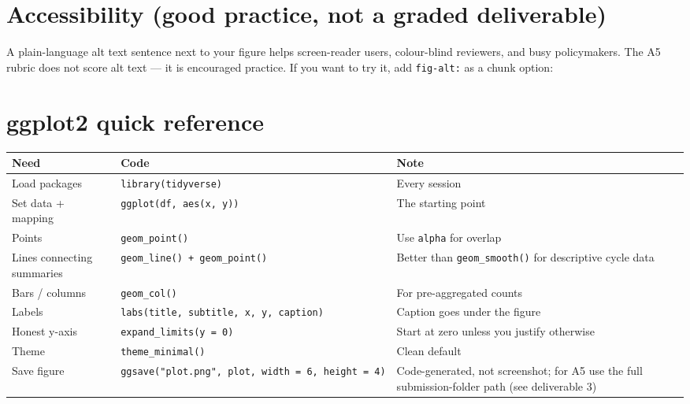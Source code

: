 \documentclass[
  letterpaper,
  DIV=11,
  numbers=noendperiod,
  oneside]{scrreprt}
\begin{document}
\section*{Accessibility (good practice, not a graded
deliverable)}\label{accessibility-good-practice-not-a-graded-deliverable}


A plain-language alt text sentence next to your figure helps
screen-reader users, colour-blind reviewers, and busy policymakers. The
A5 rubric does not score alt text --- it is encouraged practice. If you
want to try it, add \texttt{fig-alt:} as a chunk option:

\section*{ggplot2 quick reference}\label{ggplot2-quick-reference}


\begin{longtable}[]{@{}
  >{\raggedright\arraybackslash}p{}
  >{\raggedright\arraybackslash}p{}
  >{\raggedright\arraybackslash}p{}@{}}
\toprule\noalign{}
\begin{minipage}[b]{\linewidth}\raggedright
Need
\end{minipage} & \begin{minipage}[b]{\linewidth}\raggedright
Code
\end{minipage} & \begin{minipage}[b]{\linewidth}\raggedright
Note
\end{minipage} \\
\midrule\noalign{}
\endhead
\bottomrule\noalign{}
\endlastfoot
Load packages & \texttt{library(tidyverse)} & Every session \\
Set data + mapping & \texttt{ggplot(df,\ aes(x,\ y))} & The starting
point \\
Points & \texttt{geom\_point()} & Use \texttt{alpha} for overlap \\
Lines connecting summaries & \texttt{geom\_line()\ +\ geom\_point()} &
Better than \texttt{geom\_smooth()} for descriptive cycle data \\
Bars / columns & \texttt{geom\_col()} & For pre-aggregated counts \\
Labels & \texttt{labs(title,\ subtitle,\ x,\ y,\ caption)} & Caption
goes under the figure \\
Honest y-axis & \texttt{expand\_limits(y\ =\ 0)} & Start at zero unless
you justify otherwise \\
Theme & \texttt{theme\_minimal()} & Clean default \\
Save figure &
\texttt{ggsave("plot.png",\ plot,\ width\ =\ 6,\ height\ =\ 4)} &
Code-generated, not screenshot; for A5 use the full submission-folder
path (see deliverable 3) \\
\end{longtable}
\end{document}
